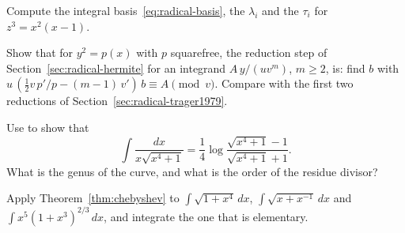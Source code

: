\begin{exercise}
Compute the integral basis~\eqref{eq:radical-basis}, the $\lambda_i$ and the
$\tau_i$ for $z^3 = x^2 (x - 1)$.
\end{exercise}

\begin{exercise}
Show that for $y^2 = p(x)$ with $p$ squarefree, the reduction step of
Section~\ref{sec:radical-hermite} for an integrand $A\,y/(u v^m)$, $m \ge 2$,
is: find $b$ with $u\,(\frac12 v\, p'/p - (m - 1)\, v')\, b \equiv A \pmod v$.
Compare with the first two reductions of Section~\ref{sec:radical-trager1979}.
\end{exercise}

\begin{exercise}
Use  to show that
\[
  \int \frac{dx}{x \sqrt{x^4 + 1}}
  = \frac14 \log \frac{\sqrt{x^4 + 1} - 1}{\sqrt{x^4 + 1} + 1} .
\]
What is the genus of the curve, and what is the order of the residue divisor?
\end{exercise}

\begin{exercise}
Apply Theorem~\ref{thm:chebyshev} to $\int \sqrt{1 + x^4}\,dx$, $\int
\sqrt{x + x^{-1}}\,dx$ and $\int x^5 (1 + x^3)^{2/3}\,dx$, and integrate the
one that is elementary.
\end{exercise}
